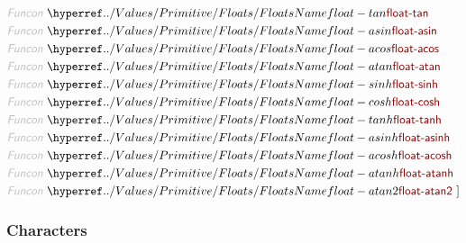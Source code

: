 \begin{align*}
  \KEY{Funcon} ~ & \NAMEHYPER{../Values/Primitive}{Floats}{float-tan} \\
  \KEY{Funcon} ~ & \NAMEHYPER{../Values/Primitive}{Floats}{float-asin} \\
  \KEY{Funcon} ~ & \NAMEHYPER{../Values/Primitive}{Floats}{float-acos} \\
  \KEY{Funcon} ~ & \NAMEHYPER{../Values/Primitive}{Floats}{float-atan} \\
  \KEY{Funcon} ~ & \NAMEHYPER{../Values/Primitive}{Floats}{float-sinh} \\
  \KEY{Funcon} ~ & \NAMEHYPER{../Values/Primitive}{Floats}{float-cosh} \\
  \KEY{Funcon} ~ & \NAMEHYPER{../Values/Primitive}{Floats}{float-tanh} \\
  \KEY{Funcon} ~ & \NAMEHYPER{../Values/Primitive}{Floats}{float-asinh} \\
  \KEY{Funcon} ~ & \NAMEHYPER{../Values/Primitive}{Floats}{float-acosh} \\
  \KEY{Funcon} ~ & \NAMEHYPER{../Values/Primitive}{Floats}{float-atanh} \\
  \KEY{Funcon} ~ & \NAMEHYPER{../Values/Primitive}{Floats}{float-atan2}
  ~ ]
\end{align*}
\subsubsection*{Characters}\hypertarget{characters}{}\label{characters}

